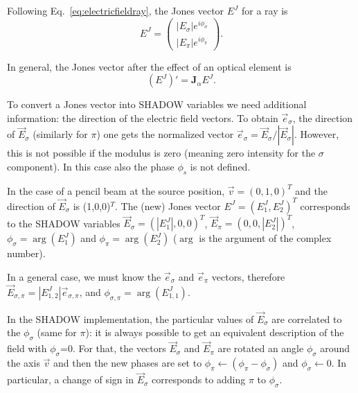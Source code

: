\documentclass{iucr}
\begin{document}
Following Eq.~\ref{eq:electricfieldray}, the Jones vector $E^J$ for a ray is
\begin{equation}
    E^J = 
    \begin{pmatrix}
        |E_{\sigma}| e^{i \phi_\sigma} \\
        |E_{\pi}| e^{i \phi_\pi}
    \end{pmatrix}.
\end{equation}

In general, the Jones vector after the effect of an optical element is
\begin{equation}
    (E^J)' = \textbf{J}_\alpha E^J.
\end{equation}

To convert a Jones vector into SHADOW variables we need additional information: the direction of the electric field vectors. To obtain $\vec{e}_\sigma$, the direction of $\vec{E}_\sigma$ (similarly for $\pi$) one gets the normalized vector $\vec{e}_\sigma=\vec{E}_\sigma/|\vec{E}_\sigma|$. However, this is not possible if the modulus is zero (meaning zero intensity for the $\sigma$ component). In this case also the phase $\phi_s$ is not defined. 

In the case of a pencil beam at the source position, $\vec{v}=(0,1,0)^T$ and the direction of $\vec{E}_\sigma$ is (1,0,0)$^T$. The (new) Jones vector $E^J=(E^J_1,E^J_2)^T$ corresponds to the SHADOW variables $\vec{E}_\sigma=(|E^J_1|,0,0)^T$, $\vec{E}_\pi=(0,0,|E^J_2|)^T$, $\phi_\sigma=\arg(E^J_1)$ and $\phi_\pi=\arg(E^J_2)$ ($\arg$ is the argument of the complex number).

In a general case, we must know the $\vec{e}_\sigma$ and $\vec{e}_\pi$ vectors, therefore $\vec{E}_{\sigma,\pi}=|E_{1,2}^J| \vec{e}_{\sigma,\pi}$, and $\phi_{\sigma,\pi}=\arg(E^J_{1,1})$.



In the SHADOW implementation, the particular values of $\vec{E}_\sigma$ are correlated to the $\phi_\sigma$ (same for $\pi$): it is always possible to get an equivalent description of the field with $\phi_\sigma$=0. For that, the vectors $\vec{E}_\sigma$ and $\vec{E}_\pi$ are rotated an angle $\phi_\sigma$ around the axis $\vec{v}$ and then the new phases are set to $\phi_\pi \xleftarrow{}(\phi_\pi-\phi_\sigma)$ and $\phi_\sigma\xleftarrow{}0$. In particular, a change of sign in $\vec{E}_\sigma$ corresponds to adding $\pi$ to $\phi_\sigma$.
\end{document}
